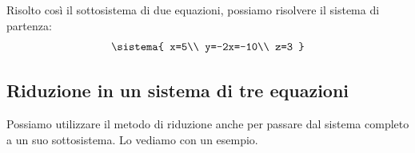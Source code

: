 \begin{soluzione}
\vspace{.5em}
Risolto così il sottosistema di due equazioni, possiamo risolvere il 
sistema di partenza:
\[\sistema{
  x=5\\
  y=-2x=-10\\
  z=3
}\]

\end{soluzione}

\subsection{Riduzione in un sistema di tre equazioni}

Possiamo utilizzare il metodo di riduzione anche per  passare dal sistema 
completo a un suo sottosistema. Lo vediamo con un esempio.

